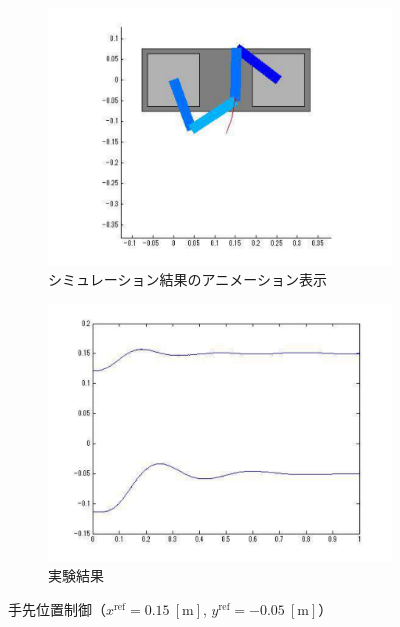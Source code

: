 \begin{figure}[H]
    \centering
    \begin{subfigure}[b]{0.45\linewidth}
        \centering
        \includegraphics[width=\linewidth]{figure/sim_anime.pdf}
        \caption{シミュレーション結果のアニメーション表示}
    \end{subfigure}
    \begin{subfigure}[b]{0.45\linewidth}
        \centering
        \includegraphics[width=\linewidth]{figure/ex_robot_guraf.pdf}
        \caption{実験結果}
    \end{subfigure}
    \caption{手先位置制御（$x^{\mathrm{ref}}=0.15\ \mathrm{[m]}$, $y^{\mathrm{ref}}=-0.05\ \mathrm{[m]}$）}
    \label{fig:xy_animation}
\end{figure}

